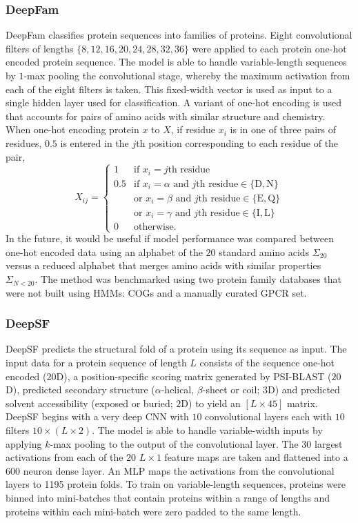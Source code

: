 \subsubsection{DeepFam}

DeepFam \cite{Seo2018} classifies protein sequences into families of proteins. Eight convolutional filters of lengths $\{8, 12, 16, 20, 24, 28, 32, 36\}$ were applied to each protein one-hot encoded protein sequence. The model is able to handle variable-length sequences by $1$-max pooling the convolutional stage, whereby the maximum activation from each of the eight filters is taken. This fixed-width vector is used as input to a single hidden layer used for classification. A variant of one-hot encoding is used that accounts for pairs of amino acids with similar structure and chemistry. When one-hot encoding protein $x$ to $X$, if residue $x_i$ is in one of three pairs of residues, $0.5$ is entered in the $j$th position corresponding to each residue of the pair,
\[
X_{ij} = \begin{cases} 1&\text{if } x_i = j\text{th residue} \\ 0.5&\text{if } x_i = \alpha \text{ and } j\text{th residue} \in \{\text{D},\text{N}\} \\ &\text{or } x_i = \beta \text{ and } j\text{th residue} \in \{\text{E},\text{Q}\} \\ &\text{or } x_i = \gamma \text{ and } j\text{th residue} \in \{\text{I},\text{L}\} \\ 0&\text{otherwise.}\end{cases}
\]
In the future, it would be useful if model performance was compared between one-hot encoded data using an alphabet of the $20$ standard amino acids $\Sigma_{20}$ versus a reduced alphabet that merges amino acids with similar properties $\Sigma_{N<20}$. The method was benchmarked using two protein family databases that were not built using HMMs: COGs and a manually curated GPCR set.

\subsubsection{DeepSF}

DeepSF \cite{Hou2018} predicts the structural fold of a protein using its sequence as input. The input data for a protein sequence of length $L$ consists of the sequence one-hot encoded ($20$D), a position-specific scoring matrix generated by PSI-BLAST ($20$D), predicted secondary structure ($\alpha$-helical, $\beta$-sheet or coil; $3$D) and predicted solvent accessibility (exposed or buried; $2$D) to yield an $[L\times 45]$ matrix. DeepSF begins with a very deep CNN with $10$ convolutional layers each with $10$ filters $10 \times (L\times 2)$. The model is able to handle variable-width inputs by applying $k$-max pooling to the output of the  convolutional layer. The $30$ largest activations from each of the $20$ $L\times 1$ feature maps are taken and flattened into a $600$ neuron dense layer. An MLP maps the activations from the convolutional layers to \num{1195} protein folds. To train on variable-length sequences, proteins were binned into mini-batches that contain proteins within a range of lengths and proteins within each mini-batch were zero padded to the same length.


